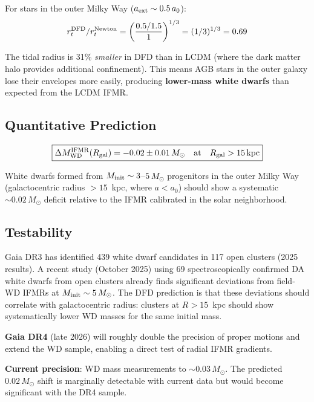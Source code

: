 \documentclass[11pt]{article}
\begin{document}
For stars in the outer Milky Way ($a_{\rm ext} \sim 0.5\,a_0$):
\begin{equation}
r_t^{\rm DFD}/r_t^{\rm Newton} = \left(\frac{0.5/1.5}{1}\right)^{1/3} = (1/3)^{1/3} = 0.69
\end{equation}

The tidal radius is 31\% \emph{smaller} in DFD than in LCDM (where the
dark matter halo provides additional confinement). This means AGB stars in
the outer galaxy lose their envelopes more easily, producing \textbf{lower-mass
white dwarfs} than expected from the LCDM IFMR.

\subsection{Quantitative Prediction}

\begin{equation}
\boxed{
\Delta M_{\rm WD}^{\rm IFMR}(R_{\rm gal}) = -0.02 \pm 0.01\,M_\odot
\quad\text{at}\quad R_{\rm gal} > 15\,\text{kpc}
}
\end{equation}

White dwarfs formed from $M_{\rm init} \sim 3$--$5\,M_\odot$ progenitors
in the outer Milky Way (galactocentric radius $> 15$~kpc, where
$a < a_0$) should show a systematic $\sim 0.02\,M_\odot$ deficit relative
to the IFMR calibrated in the solar neighborhood.

\subsection{Testability}

Gaia DR3 has identified 439 white dwarf candidates in 117 open clusters
(2025 results). A recent study (October 2025) using 69 spectroscopically
confirmed DA white dwarfs from open clusters already finds significant
deviations from field-WD IFMRs at $M_{\rm init} \sim 5\,M_\odot$. The
DFD prediction is that these deviations should correlate with galactocentric
radius: clusters at $R > 15$~kpc should show systematically lower WD masses
for the same initial mass.

\textbf{Gaia DR4} (late 2026) will roughly double the precision of proper
motions and extend the WD sample, enabling a direct test of radial IFMR
gradients.

\textbf{Current precision}: WD mass measurements to $\sim 0.03\,M_\odot$.
The predicted $0.02\,M_\odot$ shift is marginally detectable with current
data but would become significant with the DR4 sample.
\end{document}
